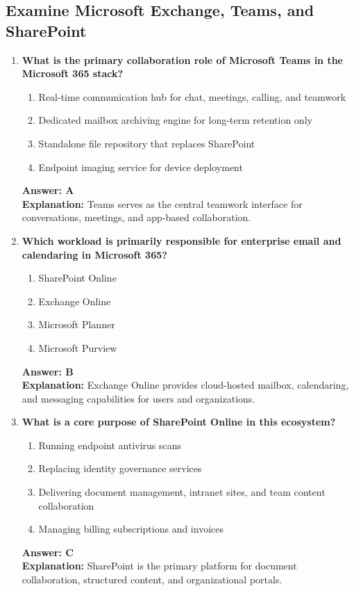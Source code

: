 \documentclass[10pt]{article}
\begin{document}
\subsection{Examine Microsoft Exchange, Teams, and SharePoint}
\begin{enumerate}[leftmargin=*]

\item \textbf{What is the primary collaboration role of Microsoft Teams in the Microsoft 365 stack?}
\begin{enumerate}[label=\Alph*.]
  \item Real-time communication hub for chat, meetings, calling, and teamwork
  \item Dedicated mailbox archiving engine for long-term retention only
  \item Standalone file repository that replaces SharePoint
  \item Endpoint imaging service for device deployment
\end{enumerate}
\textbf{Answer: A}\\
\textbf{Explanation:} Teams serves as the central teamwork interface for conversations, meetings, and app-based collaboration.

\item \textbf{Which workload is primarily responsible for enterprise email and calendaring in Microsoft 365?}
\begin{enumerate}[label=\Alph*.]
  \item SharePoint Online
  \item Exchange Online
  \item Microsoft Planner
  \item Microsoft Purview
\end{enumerate}
\textbf{Answer: B}\\
\textbf{Explanation:} Exchange Online provides cloud-hosted mailbox, calendaring, and messaging capabilities for users and organizations.

\item \textbf{What is a core purpose of SharePoint Online in this ecosystem?}
\begin{enumerate}[label=\Alph*.]
  \item Running endpoint antivirus scans
  \item Replacing identity governance services
  \item Delivering document management, intranet sites, and team content collaboration
  \item Managing billing subscriptions and invoices
\end{enumerate}
\textbf{Answer: C}\\
\textbf{Explanation:} SharePoint is the primary platform for document collaboration, structured content, and organizational portals.


\end{enumerate}
\end{document}
